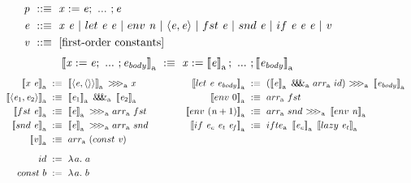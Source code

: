 \documentclass{llncs}
\newcommand{\smallmathfont}{\fontsize{7.5}{9}\selectfont}
\newcommand{\arrowarr}{\ensuremath{arr}}
\newcommand{\arrowcomp}{\ensuremath{{>}\mspace{-6mu}{>}\mspace{-6mu}{>}}}
\newcommand{\arrowpair}{\ensuremath{\mathit{\&\mspace{-7.5mu}\&\mspace{-7.5mu}\&}}}
\newcommand{\arrowif}{\ensuremath{ifte}}
\newcommand{\gen}{_\mathrm{a}}
\begin{document}
\begin{figure*}[t]
\smallmathfont
\begin{align*}
	\mathit{p} &\ ::\equiv \ \mathit{x := e};\ ...\ ; \mathit{e} \\
	\mathit{e} &\ ::\equiv \ \mathit{x~e}\ |\ let~\mathit{e~e}\ |\ env~\mathit{n}\ |\ \mathit{\pair{e,e}}\ |\ fst~\mathit{e}\ |\ snd~\mathit{e}\ |\ if~\mathit{e~e~e}\ |\ \mathit{v} \\
	\mathit{v} &\ ::\equiv \ \text{[first-order constants]}
\end{align*}
\begin{equation*}
	\meaningof{\mathit{x} := \mathit{e};\ ...\ ; \mathit{e_{body}}}\gen \ :\equiv\
		\mathit{x} := \meaningof{\mathit{e}}\gen;\ ...\ ; \meaningof{\mathit{e_{body}}}\gen
\end{equation*}
\begin{align*}
\begin{aligned}[t]
	\meaningof{\mathit{x}~\mathit{e}}\gen &\ :\equiv\
		\meaningof{\pair{\mathit{e},\pair{}}}\gen~\arrowcomp\gen~\mathit{x}
\\
	\meaningof{\pair{\mathit{e}_1,\mathit{e}_2}}\gen &\ :\equiv\
		\meaningof{\mathit{e}_1}\gen~\arrowpair\gen~\meaningof{\mathit{e}_2}\gen
\\
	\meaningof{fst~\mathit{e}}\gen &\ :\equiv\
		\meaningof{\mathit{e}}\gen~\arrowcomp\gen~\arrowarr\gen~fst
\\
	\meaningof{snd~\mathit{e}}\gen &\ :\equiv\
		\meaningof{\mathit{e}}\gen~\arrowcomp\gen~\arrowarr\gen~snd
\\
	\meaningof{\mathit{v}}\gen &\ :\equiv\ \arrowarr\gen~(const~\mathit{v})
\\[6pt]
	id &\ := \ \fun{a} a
\\
	const~b &\ := \ \fun{a} b
\\
\end{aligned}
&\tab\tab\tab\tab
\begin{aligned}[t]
	\meaningof{let~\mathit{e}~\mathit{e_{body}}}\gen &\ :\equiv\ 
		(\meaningof{\mathit{e}}\gen~\arrowpair\gen~\arrowarr\gen~id)~
			\arrowcomp\gen~
		\meaningof{\mathit{e_{body}}}\gen
\\
	\meaningof{env~0}\gen &\ :\equiv\ \arrowarr\gen~fst
\\
	\meaningof{env~(\mathit{n}+1)}\gen &\ :\equiv\ \arrowarr\gen~snd~\arrowcomp\gen~\meaningof{env~\mathit{n}}\gen
\\
	\meaningof{if~\mathit{e_c}~\mathit{e_t}~\mathit{e_f}}\gen &\ :\equiv\
		\arrowif\gen~
			\meaningof{\mathit{e_c}}\gen~
			\meaningof{lazy~\mathit{e_t}}\gen~

\end{aligned}
\end{align*}
\end{figure*}
\end{document}
